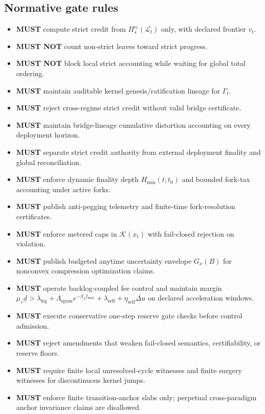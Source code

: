 \documentclass[11pt,a4paper]{article}
\newcommand{\MUST}{\textbf{MUST}}
\newcommand{\MUSTNOT}{\textbf{MUST NOT}}
\newcommand{\cK}{\mathcal{K}}
\newcommand{\cL}{\mathcal{L}}
\theoremstyle{definition}
\theoremstyle{remark}
\begin{document}
\subsection{Normative gate rules}
\begin{itemize}
  \item \MUST{} compute strict credit from $\Pi_s^{v_t}(\cL_t)$ only, with declared frontier $v_t$.
  \item \MUSTNOT{} count non-strict leaves toward strict progress.
  \item \MUSTNOT{} block local strict accounting while waiting for global total ordering.
  \item \MUST{} maintain auditable kernel genesis/ratification lineage for $\Gamma_t$.
  \item \MUST{} reject cross-regime strict credit without valid bridge certificate.
  \item \MUST{} maintain bridge-lineage cumulative distortion accounting on every deployment horizon.
  \item \MUST{} separate strict credit authority from external deployment finality and global reconciliation.
  \item \MUST{} enforce dynamic finality depth $H_{\min}(t;t_0)$ and bounded fork-tax accounting under active forks.
  \item \MUST{} publish anti-pegging telemetry and finite-time fork-resolution certificates.
  \item \MUST{} enforce metered caps in $\cK(x_t)$ with fail-closed rejection on violation.
  \item \MUST{} publish budgeted anytime uncertainty envelope $G_x(B)$ for nonconvex compression optimization claims.
  \item \MUST{} operate backlog-coupled fee control and maintain margin $\mu_v\underline d>\lambda_{\mathrm{leg}}+\Lambda_{\mathrm{spam}}e^{-\beta_f f_{\max}}+\lambda_{\mathrm{self}}+\eta_{\mathrm{self}}\overline{\Delta u}$ on declared acceleration windows.
  \item \MUST{} execute conservative one-step reserve gate checks before control admission.
  \item \MUST{} reject amendments that weaken fail-closed semantics, certifiability, or reserve floors.
  \item \MUST{} require finite local unresolved-cycle witnesses and finite surgery witnesses for discontinuous kernel jumps.
  \item \MUST{} enforce finite transition-anchor slabs only; perpetual cross-paradigm anchor invariance claims are disallowed.

\end{itemize}
\end{document}
